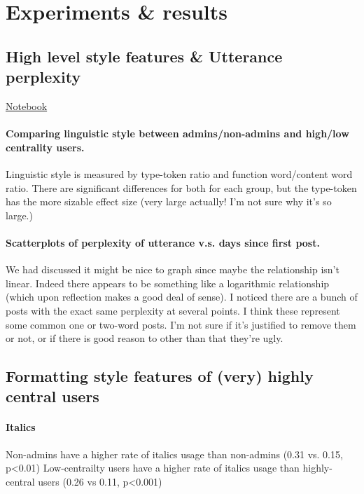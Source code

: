 \documentclass[12pt]{scrartcl}
\begin{document}
\section{Experiments \& results}

\subsection{High level style features \& Utterance perplexity} %

\href{https://github.com/winobes/lasn/blob/2991fdaa0023e038452dbfe13d0d325bb1783dfa/code/analysis.ipynb}{Notebook}

\paragraph{Comparing linguistic style between admins/non-admins and high/low centrality users.} Linguistic style is measured by type-token ratio and function word/content word ratio. There are significant differences for both for each group, but the type-token has the more sizable effect size (very large actually! I'm not sure why it's so large.)

\paragraph{Scatterplots of perplexity of utterance v.s. days since first post.} We had discussed it might be nice to graph since maybe the relationship isn't linear. Indeed there appears to be something like a logarithmic relationship (which upon reflection makes a good deal of sense). I noticed there are a bunch of posts with the exact same perplexity at several points. I think these represent some common one or two-word posts. I'm not sure if it's justified to remove them or not, or if there is good reason to other than that they're ugly.

\subsection{}

\subsection{Formatting style features of (very) highly central users} %
\paragraph{Italics}
Non-admins have a higher rate of italics usage than non-admins (0.31 vs. 0.15, p<0.01)
Low-centrailty users have a higher rate of italics usage than highly-central users (0.26 vs 0.11, p<0.001)
\end{document}
